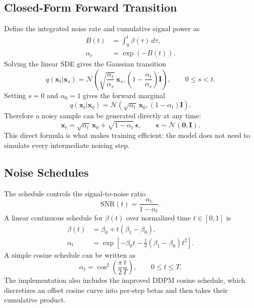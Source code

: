 \documentclass[11pt]{article}
\newcommand{\bx}{\mathbf{x}}
\newcommand{\beps}{\boldsymbol{\epsilon}}
\newcommand{\bI}{\mathbf{I}}
\newcommand{\N}{\mathcal{N}}
\begin{document}
\subsection{Closed-Form Forward Transition}

Define the integrated noise rate and cumulative signal power as
\begin{align}
  B(t) &= \int_0^t \beta(\tau)\,d\tau, \\
  \alpha_t &= \exp(-B(t)).
\end{align}
Solving the linear SDE gives the Gaussian transition
\begin{equation}
  q(\bx_t|\bx_s)
  =
  \N\!\left(
    \sqrt{\frac{\alpha_t}{\alpha_s}}\,\bx_s,
    \left(1-\frac{\alpha_t}{\alpha_s}\right)\bI
  \right),
  \qquad 0 \leq s < t.
  \label{eq:forward_transition}
\end{equation}
Setting $s=0$ and $\alpha_0=1$ gives the forward marginal
\begin{equation}
  q(\bx_t|\bx_0)
  =
  \N\!\left(\sqrt{\alpha_t}\,\bx_0, (1-\alpha_t)\bI\right).
  \label{eq:forward_marginal}
\end{equation}
Therefore a noisy sample can be generated directly at any time:
\begin{equation}
  \bx_t = \sqrt{\alpha_t}\,\bx_0 + \sqrt{1-\alpha_t}\,\beps,
  \qquad \beps \sim \N(\mathbf{0},\bI).
  \label{eq:q_sample}
\end{equation}
This direct formula is what makes training efficient: the model does not need to simulate every
intermediate noising step.

\subsection{Noise Schedules}

The schedule controls the signal-to-noise ratio
\begin{equation}
  \mathrm{SNR}(t)=\frac{\alpha_t}{1-\alpha_t}.
  \label{eq:snr}
\end{equation}
A linear continuous schedule for $\beta(t)$ over normalized time $t\in[0,1]$ is
\begin{align}
  \beta(t) &= \beta_0 + t(\beta_1-\beta_0), \\
  \alpha_t &= \exp\!\left[-\beta_0 t - \frac{1}{2}(\beta_1-\beta_0)t^2\right].
  \label{eq:linear_schedule}
\end{align}
A simple cosine schedule can be written as
\begin{equation}
  \alpha_t = \cos^2\!\left(\frac{\pi}{2}\frac{t}{T}\right),
  \qquad 0\leq t\leq T.
  \label{eq:simple_cosine}
\end{equation}
The implementation also includes the improved DDPM cosine schedule, which discretizes an offset cosine
curve into per-step betas and then takes their cumulative product.
\end{document}

